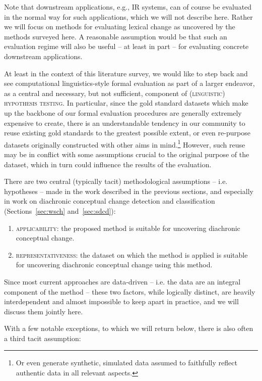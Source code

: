 \documentclass[output=paper]{langsci/langscibook}
\begin{document}
Note that downstream applications, e.g., IR systems, can of course be evaluated in the normal way for such applications, which we will not describe here. Rather we will focus on methods for evaluating lexical change as uncovered by the methods surveyed here. A reasonable assumption would be that such an evaluation regime will also be useful -- at least in part -- for evaluating concrete downstream applications.

At least in the context of this literature survey, we would like to step back and see computational linguistics-style formal evaluation as part of a larger endeavor, as a central and necessary, but not sufficient, component of \textsc{(linguistic) hypothesis testing}. In particular, since the gold standard datasets which make up the backbone of our formal evaluation procedures are generally extremely expensive to create, there is an understandable tendency in our community to reuse existing gold standards to the greatest possible extent, or even re-purpose datasets originally constructed with other aims in mind.\footnote{Or even generate synthetic, simulated data assumed to faithfully reflect authentic data in all relevant aspects.} However, such reuse may be in conflict with some assumptions crucial to the original purpose of the dataset, which in turn could influence the results of the evaluation.

There are two central (typically tacit) methodological assumptions -- i.e. hypotheses -- made in the work described in the previous sections, and especially in work on diachronic conceptual change detection and classification (Sections~\ref{sec:wsch} and~\ref{sec:sdcd}):

\begin{enumerate}
    \item \textsc{applicability:} the proposed method is suitable for uncovering diachronic conceptual change.\label{hypo1}
    \item \textsc{representativeness:} the dataset on which the method is applied is suitable for uncovering diachronic conceptual change using this method.\label{hypo2}
\end{enumerate}

Since most current approaches are data-driven -- i.e. the data are an integral component of the method -- these two factors, while logically distinct, are heavily interdependent and almost impossible to keep apart in practice, and we will discuss them jointly here.

With a few notable exceptions, to which we will return below, there is also often a third tacit assumption:
\end{document}
